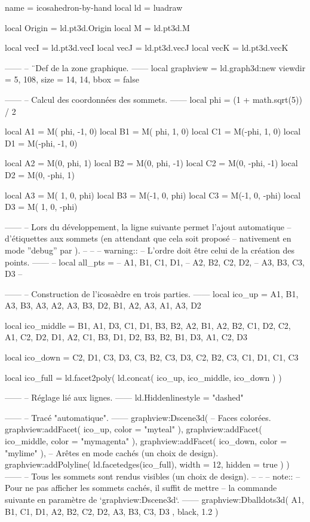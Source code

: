 \documentclass[border = 3pt]{standalone}
\begin{document}
\begin{luadraw*}{name = icosahedron-by-hand}
local ld = luadraw

local Origin = ld.pt3d.Origin
local M      = ld.pt3d.M

local vecI = ld.pt3d.vecI
local vecJ = ld.pt3d.vecJ
local vecK = ld.pt3d.vecK

------
-- ¨Def de la zone graphique.
------
local graphview = ld.graph3d:new{
  viewdir  = {5, 108},
  size     = {14, 14},
  bbox     = false
}

------
-- Calcul des coordonnées des sommets.
------
local phi = (1 + math.sqrt(5)) / 2

local A1 = M( phi, -1, 0)
local B1 = M( phi,  1, 0)
local C1 = M(-phi,  1, 0)
local D1 = M(-phi, -1, 0)

local A2 = M(0,  phi,  1)
local B2 = M(0,  phi, -1)
local C2 = M(0, -phi, -1)
local D2 = M(0, -phi,  1)

local A3 = M( 1, 0,  phi)
local B3 = M(-1, 0,  phi)
local C3 = M(-1, 0, -phi)
local D3 = M( 1, 0, -phi)

------
-- Lors du développement, la ligne suivante permet l'ajout automatique
-- d'étiquettes aux sommets (en attendant que cela soit proposé
-- nativement en mode ''debug'' par \luadraw).
--
--
--  warning::
--      L'ordre doit être celui de la création des points.
------
-- local all_pts = {
--   A1, B1, C1, D1,
--   A2, B2, C2, D2,
--   A3, B3, C3, D3
-- }

------
-- Construction de l'icosaèdre en trois parties.
------
local ico_up = {
  {A1, B1, A3},
  {B3, A3, A2},
  {A3, B3, D2},
  {B1, A2, A3},
  {A1, A3, D2}
}

local ico_middle = {
  {B1, A1, D3},
  {C1, D1, B3},
  {B2, A2, B1},
  {A2, B2, C1},
  {D2, C2, A1},
  {C2, D2, D1},
  {A2, C1, B3},
  {D1, D2, B3},
  {B2, B1, D3},
  {A1, C2, D3}
}

local ico_down = {
  {C2, D1, C3},
  {D3, C3, B2},
  {C3, D3, C2},
  {B2, C3, C1},
  {D1, C1, C3}
}

local ico_full = ld.facet2poly(
  ld.concat(
    ico_up,
    ico_middle,
    ico_down
  )
)

------
-- Réglage lié aux lignes.
------
ld.Hiddenlinestyle = "dashed"

------
-- Tracé "automatique".
------
graphview:Dscene3d(
-- Faces colorées.
  graphview:addFacet(
    ico_up,
    {
      color = "myteal"
    }
  ),
  graphview:addFacet(
    ico_middle,
    {
      color = "mymagenta"
    }
  ),
  graphview:addFacet(
    ico_down,
    {
      color = "mylime"
    }
  ),
-- Arêtes en mode cachés (un choix de design).
  graphview:addPolyline(
    ld.facetedges(ico_full),
    {
      width = 12,
      hidden = true
    }
  )
)
------
-- Tous les sommets sont rendus visibles (un choix de design).
--
--
-- note::
--     Pour ne pas afficher les sommets cachés, il suffit de mettre
--     la commande suivante en paramètre de `graphview:Dscene3d`.
------
graphview:Dballdots3d(
  {
    A1, B1, C1, D1,
    A2, B2, C2, D2,
    A3, B3, C3, D3
  },
  black,
  1.2
)


\end{luadraw*}
\end{document}
